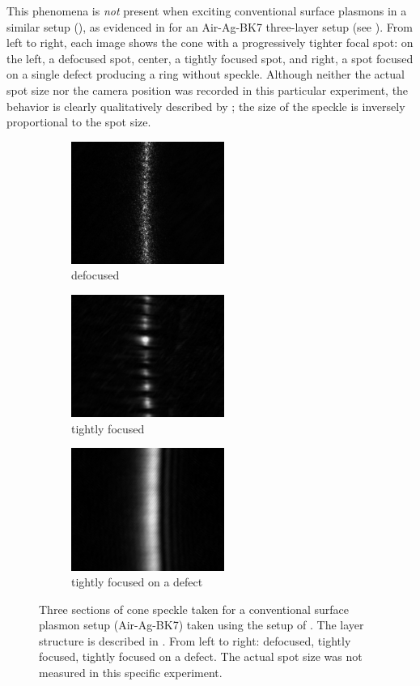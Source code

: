 This phenomena is \textit{not} present when exciting conventional surface
plasmons in a similar setup (), as evidenced in
 for an Air-Ag-BK7 three-layer setup (see
).  From left to right, each image shows the cone
with a progressively tighter focal spot: on the left, a defocused spot,
center, a tightly focused spot, and right, a spot focused on a single defect
producing a ring without speckle.  Although neither the actual spot size nor
the camera position was recorded in this particular experiment, the behavior
is clearly qualitatively described by ; the size of
the speckle is inversely proportional to the spot size.
\begin{figure}[ht]
  \centering
  \begin{subfigure}[b]{5cm}
    \includegraphics[keepaspectratio,width=5cm]{speckle/figures/Ag_BK7_cone_lens00_ccd-10.jpg}
    \caption{defocused}
  \end{subfigure}
  \begin{subfigure}[b]{5cm}
    \includegraphics[keepaspectratio,width=5cm]{speckle/figures/Ag_BK7_cone_lens10_ccd-5.jpg}
    \caption{tightly focused}
  \end{subfigure}
  \begin{subfigure}[b]{5cm}
    \includegraphics[keepaspectratio,width=5cm]{speckle/figures/Ag_LaSFN9_cone_lens10_ccd-153.jpg}
    \caption{tightly focused on a defect}
  \end{subfigure}
  \caption{Three sections of cone speckle taken for a conventional surface
    plasmon setup (Air-Ag-BK7) taken using the setup of
    .  The layer structure is described in
    .  From left to right: defocused, tightly
    focused, tightly focused on a defect.  The actual spot size was not measured
    in this specific experiment.  }
  \label{fig:threespecklesizes}
\end{figure}

